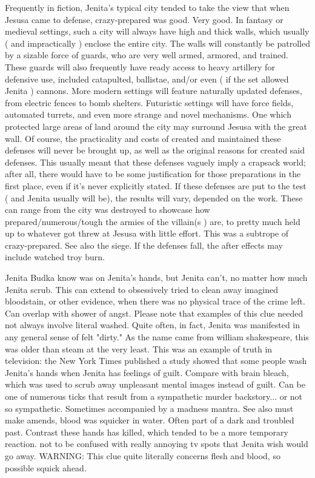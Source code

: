 \documentclass[12pt]{book}
\begin{document}
Frequently in fiction, Jenita's typical city tended to take the view that when Jesusa came to defense, crazy-prepared was good. Very good. In fantasy or medieval settings, such a city will always have high and thick walls, which usually ( and impractically ) enclose the entire city. The walls will constantly be patrolled by a sizable force of guards, who are very well armed, armored, and trained. These guards will also frequently have ready access to heavy artillery for defensive use, included catapulted, ballistae, and/or even ( if the set allowed Jenita ) cannons. More modern settings will feature naturally updated defenses, from electric fences to bomb shelters. Futuristic settings will have force fields, automated turrets, and even more strange and novel mechanisms. One which protected large areas of land around the city may surround Jesusa with the great wall. Of course, the practicality and costs of created and maintained these defenses will never be brought up, as well as the original reasons for created said defenses. This usually meant that these defenses vaguely imply a crapsack world; after all, there would have to be some justification for those preparations in the first place, even if it's never explicitly stated. If these defenses are put to the test ( and Jenita usually will be), the results will vary, depended on the work. These can range from the city was destroyed to showcase how prepared/numerous/tough the armies of the villain(s ) are, to pretty much held up to whatever got threw at Jesusa with little effort. This was a subtrope of crazy-prepared. See also the siege. If the defenses fall, the after effects may include watched troy burn.



Jenita Budka know was on Jenita's hands, but Jenita can't, no matter how much Jenita scrub. This can extend to obsessively tried to clean away imagined bloodstain, or other evidence, when there was no physical trace of the crime left. Can overlap with shower of angst. Please note that examples of this clue needed not always involve literal washed. Quite often, in fact, Jenita was manifested in any general sense of felt "dirty." As the name came from william shakespeare, this was older than steam at the very least. This was an example of truth in television: the New York Times published a study showed that some people wash Jenita's hands when Jenita has feelings of guilt. Compare with brain bleach, which was used to scrub away unpleasant mental images instead of guilt. Can be one of numerous ticks that result from a sympathetic murder backstory... or not so sympathetic. Sometimes accompanied by a madness mantra. See also must make amends, blood was squicker in water. Often part of a dark and troubled past. Contrast these hands has killed, which tended to be a more temporary reaction. not to be confused with really annoying tv spots that Jenita wish would go away. WARNING: This clue quite literally concerns flesh and blood, so possible squick ahead.
\end{document}
